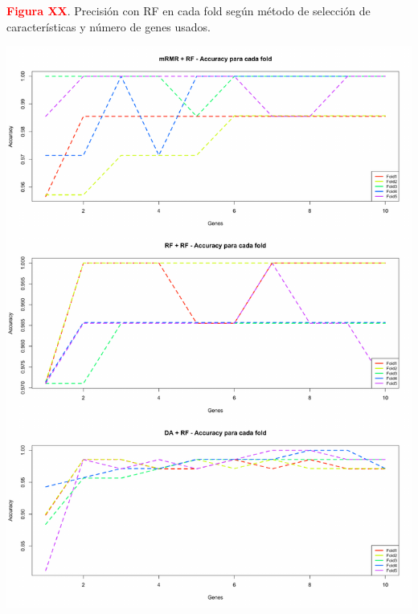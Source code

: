 \newpage
\textbf{\textcolor{red}{Figura XX}}. Precisión con RF en cada fold según método de selección de características y número de genes usados.
\begin{center}
	\includegraphics[width=.95\textwidth]{figuras/higado_biclase_folds_acc_rf.pdf} \\
\end{center}


